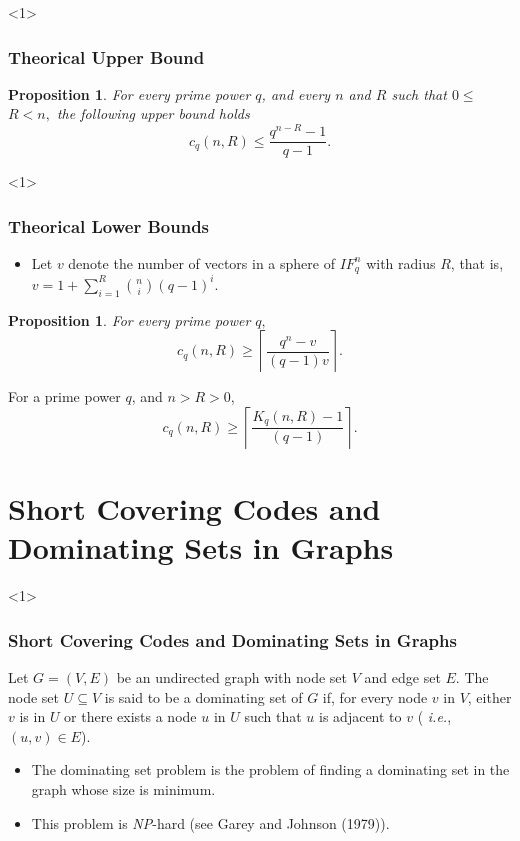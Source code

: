 \documentclass{beamer}
\newtheorem{proposition}[theorem]{Proposition}
\begin{document}
\begin{frame}<1>
  \frametitle{Theorical Upper Bound}
{

\begin{proposition}
\label{ls}For every prime power $q$, and every $n$ and $R$ such that $0\leq $
$R<n,$ the following upper bound holds
\[
c_{q}(n,R)\leq \frac{q^{n-R}-1}{q-1}.
\]
\end{proposition}
 
}
\end{frame}

\begin{frame}<1>
  \frametitle{Theorical Lower Bounds}
{
\footnotesize
\begin{itemize}
	\item  Let $v$ denote the number of vectors in a sphere of $%
\mbox{$I\!\!
F\!$}_{q}^{n}$ with radius $R$, that is, $v=1+\sum_{i=1}^{R}{n \choose i}%
(q-1)^{i}$.
\end{itemize}

\begin{proposition}
\label{li}For every prime power $q,$%
\[
c_{q}(n,R)\geq \left\lceil \frac{q^{n}-v}{(q-1)v}\right\rceil .
\]
\end{proposition}


\begin{theorem}
\label{cone1}For a prime power $q$, and $n>R>0$,
\[
c_{q}(n,R)\geq \left\lceil \frac{K_{q}(n,R)-1}{(q-1)}\right\rceil .
\]
\end{theorem}
}
\end{frame}

\section{Short Covering Codes and Dominating Sets in Graphs}

\begin{frame}<1>
  \frametitle{Short Covering Codes and Dominating Sets in Graphs}
{
\begin{definition}
Let $G=(V,E)$ be an undirected graph with node set $V$ and edge set $E$. The node set
$U \subseteq V$ is said to be a dominating set of $G$ if, for every node $v$ in $V$, either
$v$ is in $U$ or there exists a node $u$ in $U$ such that $u$ is adjacent to $v$ ({\em
i.e.}, $(u,v) \in E$).
\end{definition}

\begin{itemize}
	\item The dominating set problem is the problem of finding a dominating
set in the graph whose size is minimum. 
	\item This problem is {\em NP}-hard (see Garey and Johnson (1979)). 
\end{itemize}

}
\end{frame}
\end{document}
